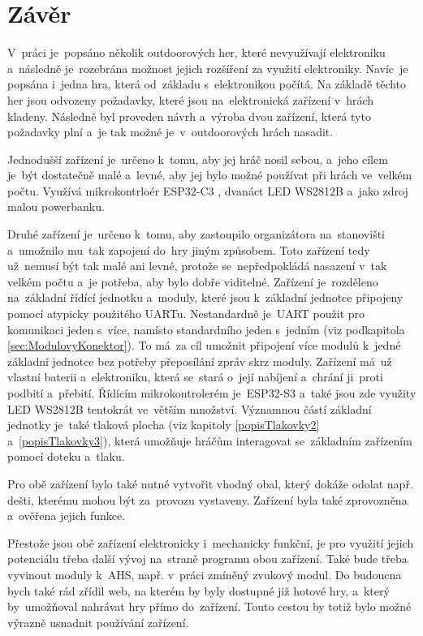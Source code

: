 \chapter*{Závěr}
{}

V~práci je~popsáno několik outdoorových her, které nevyužívají elektroniku a~následně je~rozebrána možnost jejich rozšíření za využití elektroniky.
Navíc~je popsána i~jedna hra, která od~základu s~elektronikou počítá.
Na základě těchto her jsou odvozeny požadavky, které jsou na~elektronická zařízení v~hrách kladeny.
Následně byl proveden návrh a~výroba dvou zařízení, která tyto požadavky plní a~je tak možné je~v~outdoorových hrách nasadit.

Jednodušší zařízení je~určeno k~tomu, aby jej hráč nosil sebou, a~jeho cílem je~být dostatečně malé a~levné, aby jej bylo možné používat při hrách ve~velkém počtu.
Využívá mikrokontrloér ESP32-C3 \cite{ESP32C3}, dvanáct LED WS2812B \cite{WS2812B} a~jako zdroj malou powerbanku.

Druhé zařízení je~určeno k~tomu, aby zastoupilo organizátora na~stanovišti a~umožnilo mu~tak zapojení do~hry jiným způsobem.
Toto zařízení tedy už~nemusí být tak malé ani levné, protože se~nepředpokládá nasazení v~tak velkém počtu a~je potřeba, aby bylo dobře viditelné.
Zařízení je~rozděleno na~základní řídící jednotku a~moduly, které jsou k~základní jednotce připojeny pomocí atypicky použitého UARTu.
Nestandardně je~UART použit pro komunikaci jeden s~více, namísto standardního jeden s~jedním (viz podkapitola \ref{sec:ModulovyKonektor}).
To má~za cíl umožnit připojení více modulů k~jedné základní jednotce bez potřeby přeposílání zpráv skrz moduly.
Zařízení má~už vlastní baterii a~elektroniku, která se~stará o~její nabíjení a~chrání ji~proti podbití a~přebití.
Řídícím mikrokontrolerém je~ESP32-S3 \cite{ESP32S3} a~také jsou zde využity LED WS2812B tentokrát ve~větším množství.
Významnou částí základní jednotky je~také tlaková plocha (viz kapitoly \ref{popisTlakovky2} a~\ref{popisTlakovky3}), která umožňuje hráčům interagovat se~základním zařízením pomocí doteku a~tlaku.

Pro obě zařízení bylo také nutné vytvořit vhodný obal, který dokáže odolat např. dešti, kterému mohou být za~provozu vystaveny.
Zařízení byla také zprovozněna a~ověřena jejich funkce.

Přestože jsou obě zařízení elektronicky i~mechanicky funkční, je pro využití jejich potenciálu třeba další vývoj na~straně programu obou zařízení.
Také bude třeba vyvinout moduly k~AHS, např. v~práci zmíněný zvukový modul.
Do budoucna bych také rád zřídil web, na kterém by byly dostupné již hotové hry, a~který by~umožňoval nahrávat hry přímo do~zařízení.
Touto cestou by totiž bylo možné výrazně usnadnit používání zařízení.